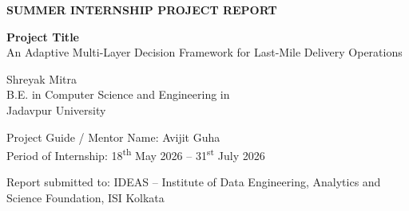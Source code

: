 \documentclass{article}
\begin{document}
\begin{titlepage}
    \centering
    
    {\color{titlered}\Large\textbf{SUMMER INTERNSHIP PROJECT REPORT}}
    
    \vspace{2.5cm}
    
    {\Huge\textbf{Project Title}} \\[0.4cm]
    {\color{titlered}\Large An Adaptive Multi-Layer Decision Framework for Last-Mile Delivery Operations}
    
    \vspace{2.5cm}
    
    {\Large Shreyak Mitra} \\[0.3cm]
    {\large B.E. in Computer Science and Engineering in \\ Jadavpur University} 
    
    \vspace{2cm}
    
    {\large Project Guide / Mentor Name: Avijit Guha} \\[0.8cm]
    {\large Period of Internship: 18\textsuperscript{th} May 2026 -- 31\textsuperscript{st} July 2026}
    
    \vspace{2cm}
    
    {\Large Report submitted to: IDEAS -- Institute of Data Engineering, Analytics and Science Foundation, ISI Kolkata}

\end{titlepage}
\end{document}
